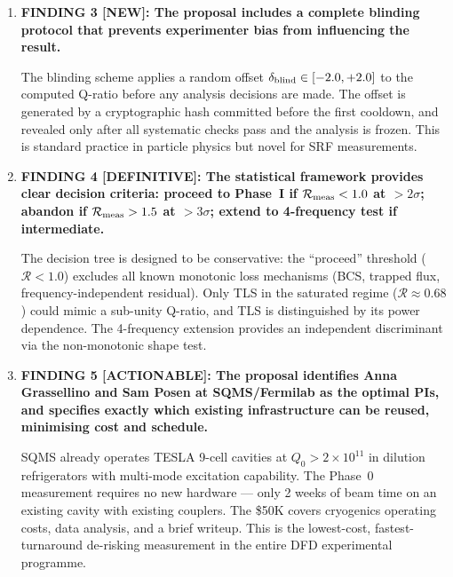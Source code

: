 \documentclass[11pt]{article}
\newcommand{\ee}[1]{\times 10^{#1}}
\newcommand{\Rq}{\mathcal{R}}
\begin{document}
\begin{tcolorbox}[colback=blue!5!white, colframe=blue!60!black,
  title=\textbf{W4i17 TOP 5 FINDINGS --- Ranked by Programme Impact}]
\begin{enumerate}
\item \textbf{FINDING 3 [NEW]: The proposal includes a complete
blinding protocol that prevents experimenter bias from influencing the
result.}

The blinding scheme applies a random offset $\delta_{\rm blind} \in
[-2.0, +2.0]$ to the computed Q-ratio before any analysis decisions
are made. The offset is generated by a cryptographic hash committed
before the first cooldown, and revealed only after all systematic
checks pass and the analysis is frozen. This is standard practice in
particle physics but novel for SRF measurements.

\item \textbf{FINDING 4 [DEFINITIVE]: The statistical framework
provides clear decision criteria: proceed to Phase~I if
$\Rq_{\rm meas} < 1.0$ at $>2\sigma$; abandon if $\Rq_{\rm meas} >
1.5$ at $>3\sigma$; extend to 4-frequency test if intermediate.}

The decision tree is designed to be conservative: the ``proceed''
threshold ($\Rq < 1.0$) excludes all known monotonic loss mechanisms
(BCS, trapped flux, frequency-independent residual). Only TLS in the
saturated regime ($\Rq \approx 0.68$) could mimic a sub-unity
Q-ratio, and TLS is distinguished by its power dependence. The
4-frequency extension provides an independent discriminant via the
non-monotonic shape test.

\item \textbf{FINDING 5 [ACTIONABLE]: The proposal identifies Anna
Grassellino and Sam Posen at SQMS/Fermilab as the optimal PIs, and
specifies exactly which existing infrastructure can be reused,
minimising cost and schedule.}

SQMS already operates TESLA 9-cell cavities at $Q_0 > 2\ee{11}$ in
dilution refrigerators with multi-mode excitation capability. The
Phase~0 measurement requires no new hardware --- only 2 weeks of beam
time on an existing cavity with existing couplers. The \$50K covers
cryogenics operating costs, data analysis, and a brief writeup. This
is the lowest-cost, fastest-turnaround de-risking measurement in the
entire DFD experimental programme.

\end{enumerate}
\end{tcolorbox}

\tableofcontents
\newpage


\end{document}
